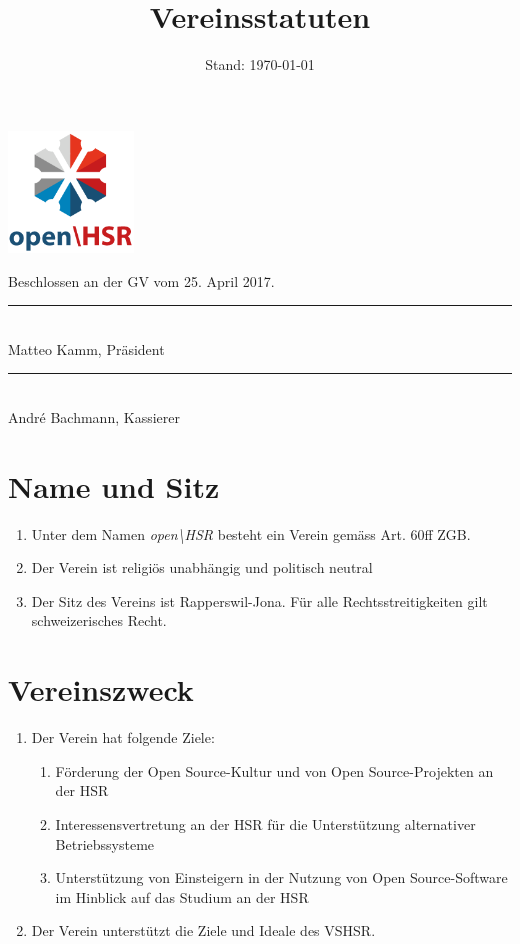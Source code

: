 \documentclass[10pt,a4paper,parskip,fleqn]{scrartcl}
\title{\Huge Vereinsstatuten}
\date{Stand: \today}
\newcommand{\ol}{\begin{enumerate}[itemsep=-0.2em,topsep=-0.2em]}
\newcommand{\lo}{\end{enumerate}}
\newcommand{\li}{\item}
\begin{document}
\begin{titlepage}
  \maketitle
  \thispagestyle{empty} %
  \begin{center}
    \includegraphics[width=0.25\textwidth]{logo.png}\\

    \vfill

    \large Beschlossen an der GV vom 25. April 2017.

    \vspace{1.5cm}

    \begin{minipage}[t]{0.49\textwidth}
      \center
      \rule{5cm}{0.2mm}\\
      Matteo Kamm, Präsident
      \endcenter
    \end{minipage}
    \begin{minipage}[t]{0.49\textwidth}
      \center
      \rule{5cm}{0.2mm}\\
      André Bachmann, Kassierer
      \endcenter
    \end{minipage}
  \end{center}
\end{titlepage}


\section{Name und Sitz}

\ol
  \li Unter dem Namen \textit{open\textbackslash{}HSR} besteht ein Verein gemäss Art. 60ff
  ZGB.
  \li Der Verein ist religiös unabhängig und politisch neutral
  \li Der Sitz des Vereins ist Rapperswil-Jona. Für alle Rechtsstreitigkeiten
  gilt schweizerisches Recht.
\lo


\section{Vereinszweck}

\ol
  \li Der Verein hat folgende Ziele:
    \ol
      \li Förderung der Open Source-Kultur und von Open Source-Projekten an
      der HSR
      \li Interessensvertretung an der HSR für die Unterstützung
      alternativer Betriebssysteme
      \li Unterstützung von Einsteigern in der Nutzung von Open
      Source-Software im Hinblick auf das Studium an der HSR
    \lo
  \li Der Verein unterstützt die Ziele und Ideale des VSHSR. 
\lo
\end{document}
